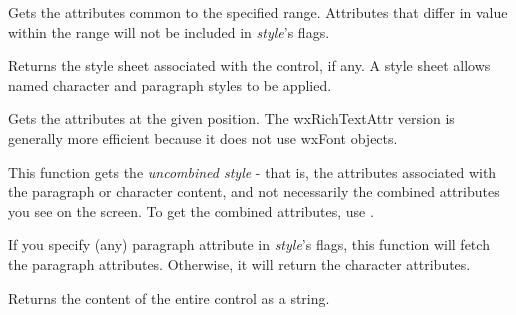 \label{wxrichtextctrlgetstyleforrange}



Gets the attributes common to the specified range. Attributes that differ in value within the range will
not be included in {\it style}'s flags.

\label{wxrichtextctrlgetstylesheet}


Returns the style sheet associated with the control, if any. A style sheet allows named
character and paragraph styles to be applied.

\label{wxrichtextctrlgetuncombinedstyle}




Gets the attributes at the given position. The wxRichTextAttr version is generally more efficient
because it does not use wxFont objects.

This function gets the {\it uncombined style} - that is, the attributes associated with the
paragraph or character content, and not necessarily the combined attributes you see on the
screen. To get the combined attributes, use .

If you specify (any) paragraph attribute in {\it style}'s flags, this function will fetch
the paragraph attributes. Otherwise, it will return the character attributes.

\label{wxrichtextctrlgetvalue}


Returns the content of the entire control as a string.

\label{wxrichtextctrlgetvisiblelineforcaretposition}


